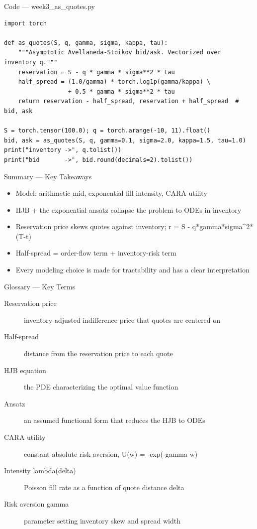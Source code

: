 \documentclass[aspectratio=169,10pt]{beamer}
\begin{document}
\begin{frame}[fragile]{Code --- week3\_as\_quotes.py}
\begin{lstlisting}
import torch

def as_quotes(S, q, gamma, sigma, kappa, tau):
    """Asymptotic Avellaneda-Stoikov bid/ask. Vectorized over inventory q."""
    reservation = S - q * gamma * sigma**2 * tau
    half_spread = (1.0/gamma) * torch.log1p(gamma/kappa) \
                  + 0.5 * gamma * sigma**2 * tau
    return reservation - half_spread, reservation + half_spread  # bid, ask

S = torch.tensor(100.0); q = torch.arange(-10, 11).float()
bid, ask = as_quotes(S, q, gamma=0.1, sigma=2.0, kappa=1.5, tau=1.0)
print("inventory ->", q.tolist())
print("bid       ->", bid.round(decimals=2).tolist())
\end{lstlisting}
\end{frame}
\begin{frame}{Summary --- Key Takeaways}
\begin{itemize}
  \item Model: arithmetic mid, exponential fill intensity, CARA utility
  \item HJB + the exponential ansatz collapse the problem to ODEs in inventory
  \item Reservation price skews quotes against inventory; r = S - q*gamma*sigma\textasciicircum{}2*(T-t)
  \item Half-spread = order-flow term + inventory-risk term
  \item Every modeling choice is made for tractability and has a clear interpretation
\end{itemize}
\end{frame}

\begin{frame}{Glossary --- Key Terms}
\footnotesize\begin{description}
\item[\color{ncsured}Reservation price] inventory-adjusted indifference price that quotes are centered on
\item[\color{ncsured}Half-spread] distance from the reservation price to each quote
\item[\color{ncsured}HJB equation] the PDE characterizing the optimal value function
\item[\color{ncsured}Ansatz] an assumed functional form that reduces the HJB to ODEs
\item[\color{ncsured}CARA utility] constant absolute risk aversion, U(w) = -exp(-gamma w)
\item[\color{ncsured}Intensity lambda(delta)] Poisson fill rate as a function of quote distance delta
\item[\color{ncsured}Risk aversion gamma] parameter setting inventory skew and spread width
\end{description}
\end{frame}
\end{document}
